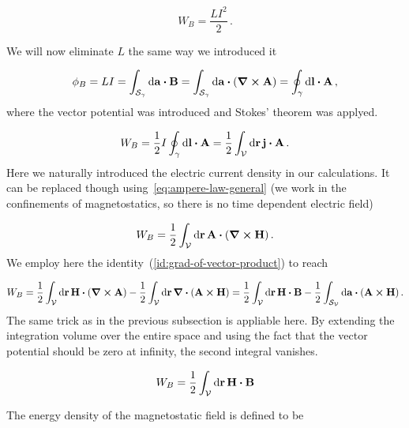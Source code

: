 \documentclass[12pt, class=report, crop=false]{standalone}
\begin{document}
\begin{equation*}
  W_{B} = \frac{LI^2}{2} \,.
\end{equation*}

\par
We will now eliminate \(L\) the same way we introduced it

\begin{equation*}
  \phi_{B} = LI = \int_{\mathcal{S}_\mathcal{\gamma}} \dd{\vb{a}} \vdot \vb{B} =  \int_{\mathcal{S}_\mathcal{\gamma}} \dd{\vb{a}} \vdot (\curl{\vb{A}}) = \oint_{\gamma} \dd{\vb{l}}\vdot \vb{A} \,,
\end{equation*}
where the vector potential was introduced and Stokes' theorem  was applyed.

\begin{equation*}
  W_{B} = \frac{1}{2} I \oint_{\gamma} \dd{\vb{l}}\vdot \vb{A} = \frac{1}{2} \int_\mathcal{V} \dd{\vb{r}} \vb{j}\vdot\vb{A} \,.
\end{equation*}
Here we naturally introduced the electric current density in our calculations. It can be replaced though using~\cref{eq:ampere-law-general} (we work in the confinements of magnetostatics, so there is no time dependent electric field)

\begin{equation*}
  W_{B} = \frac{1}{2} \int_\mathcal{V} \dd{\vb{r}} \vb{A}\vdot (\curl{\vb{H}}) \,.
\end{equation*}
We employ here the identity~(\ref{id:grad-of-vector-product}) to reach

\begin{equation*}
  W_{B} = \frac{1}{2} \int_\mathcal{V} \dd{\vb{r}} \vb{H}\vdot (\curl{\vb{A}}) - \frac{1}{2} \int_\mathcal{V} \dd{\vb{r}} \div{(\vb{A}\cp\vb{H})} = \frac{1}{2} \int_\mathcal{V} \dd{\vb{r}} \vb{H}\vdot \vb{B} - \frac{1}{2} \int_{\mathcal{S}_\mathcal{V}} \dd{\vb{a}} \vdot (\vb{A}\cp\vb{H}) \,.
\end{equation*}
The same trick as in the previous subsection is appliable here. By extending the integration volume over the entire space and using the fact that the vector potential should be zero at infinity, the second integral vanishes.

\begin{equation}
  W_{B} = \frac{1}{2} \int_\mathcal{V} \dd{\vb{r}} \vb{H}\vdot \vb{B}
\end{equation}

\par
The energy density of the magnetostatic field is defined to be
\end{document}
